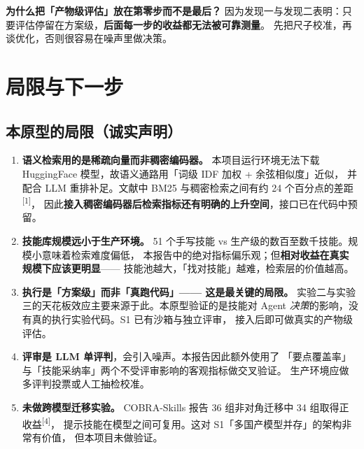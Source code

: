 \documentclass[UTF8, fontset=windows, 11pt, a4paper]{ctexart}
\begin{document}
\textbf{为什么把「产物级评估」放在第零步而不是最后？}
因为发现一与发现二表明：只要评估停留在方案级，\textbf{后面每一步的收益都无法被可靠测量}。
先把尺子校准，再谈优化，否则很容易在噪声里做决策。

\newpage

\section{局限与下一步}

\subsection{本原型的局限（诚实声明）}

\begin{enumerate}
\item \textbf{语义检索用的是稀疏向量而非稠密编码器。}
      本项目运行环境无法下载 HuggingFace 模型，故语义通路用「词级 IDF 加权 + 余弦相似度」近似，
      并配合 LLM 重排补足。文献中 BM25 与稠密检索之间有约 24 个百分点的差距\textsuperscript{[1]}，
      因此\textbf{接入稠密编码器后检索指标还有明确的上升空间}，接口已在代码中预留。

\item \textbf{技能库规模远小于生产环境。}
      51 个手写技能 vs 生产级的数百至数千技能。规模小意味着检索难度偏低，
      本报告中的绝对指标偏乐观；但\textbf{相对收益在真实规模下应该更明显}——
      技能池越大，「找对技能」越难，检索层的价值越高。

\item \textbf{执行是「方案级」而非「真跑代码」—— 这是最关键的局限。}
      实验二与实验三的天花板效应主要来源于此。本原型验证的是技能对 Agent
      \emph{决策}的影响，没有真的执行实验代码。S1 已有沙箱与独立评审，
      接入后即可做真实的产物级评估。

\item \textbf{评审是 LLM 单评判}，会引入噪声。本报告因此额外使用了
      「要点覆盖率」与「技能采纳率」两个不受评审影响的客观指标做交叉验证。
      生产环境应做多评判投票或人工抽检校准。

\item \textbf{未做跨模型迁移实验。}
      COBRA-Skills 报告 36 组非对角迁移中 34 组取得正收益\textsuperscript{[4]}，
      提示技能在模型之间可复用。这对 S1「多国产模型并存」的架构非常有价值，
      但本项目未做验证。
\end{enumerate}
\end{document}
